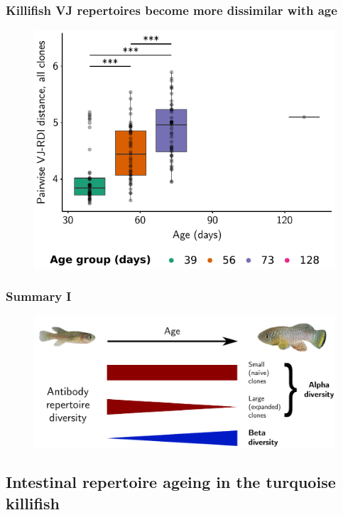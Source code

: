 \documentclass[presentation]{beamer}
\newlength{\slideheight}
\begin{document}
\begin{frame}
\frametitle{Killifish VJ repertoires become \textbf{more dissimilar} with age}
\begin{figure}
\includegraphics[height=\slideheight]{figs/pdf/ageing-rdi}
\end{figure}
\end{frame}

\begin{frame}
\frametitle{Summary I}
\begin{figure}
\includegraphics[width=\textwidth]{figs/pdf/graphical-summary-1}
\end{figure}
\end{frame}


\blackslide

\subsection{Intestinal repertoire ageing in the turquoise killifish}
\end{document}
